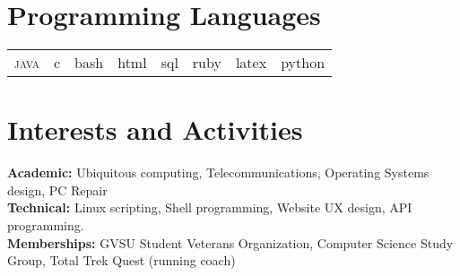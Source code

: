 \documentclass[a4paper,10pt]{article}
\newcommand{\fournotes}{%
\textcolor{noteone}{\symbol{"2022}}
\textcolor{notetwo}{\symbol{"2022}}
\textcolor{notethree}{\symbol{"2022}}
\textcolor{notefour}{\symbol{"2022}}
\textcolor{white}{\symbol{"2022}}
}
\newcommand{\threenotes}{%
\textcolor{noteone}{\symbol{"2022}}
\textcolor{notetwo}{\symbol{"2022}}
\textcolor{notethree}{\symbol{"2022}}
\textcolor{white}{\symbol{"2022}}
\textcolor{white}{\symbol{"2022}}
}
\newcommand{\twonotes}{%
\textcolor{noteone}{\symbol{"2022}}
\textcolor{notetwo}{\symbol{"2022}}
\textcolor{white}{\symbol{"2022}}
\textcolor{white}{\symbol{"2022}}
\textcolor{white}{\symbol{"2022}}
}
\begin{document}
\section{\textbf{Programming Languages}}
\begin{tabular}{r|r|r|r|r|r|r|r}
  \textsc{java} \small\emph{\fournotes} &
  c \small\emph{\fournotes} &
  bash \small\emph{\fournotes} &
  html \small\emph{\fournotes} &
  sql \small\emph{\threenotes} & 
  ruby \small\emph{\threenotes} &
  latex \small\emph{\threenotes} & 
  python \small\emph{\twonotes}
\end{tabular}


\section{\textbf{Interests and Activities}}
  \textbf{Academic:} Ubiquitous computing, Telecommunications, Operating Systems design, PC Repair \\
      \textbf{Technical:} Linux scripting, Shell programming, Website UX design, API programming. \\
  \textbf{Memberships:} GVSU Student Veterans Organization, Computer Science Study Group, Total Trek Quest (running coach) \\

  

\end{document}
